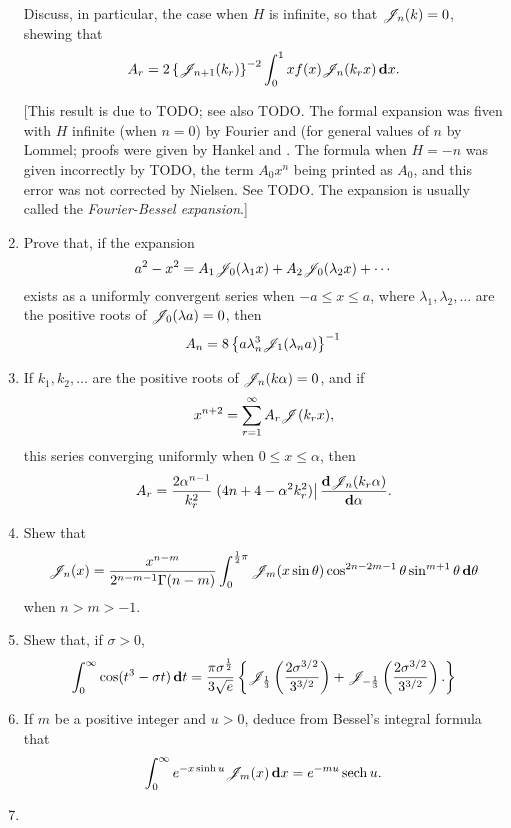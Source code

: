 \documentclass{book}
\begin{document}
\begin{enumerate}
  Discuss, in particular, the case when $H$ is infinite, so that
  $\mathscr{J}_{n}(k)=0$, shewing that
  $$
  A_{r}
  =
  2 \left\{ \mathscr{J}_{n+1}(k_{r}) \right\}^{-2}
  \int_{0}^{1}
  x f(x) \mathscr{J}_{n}(k_{r}x)
  \, \mathbf{d} x.
  $$

  [This result is due to TODO; see also TODO. The formal expansion was
  fiven with $H$ infinite (when $n=0$) by Fourier and (for general
  values of $n$ by Lommel; proofs were given by Hankel and \Schlafli.
  The formula when $H = -n$ was given incorrectly by TODO, the term
  $A_{0}x^{n}$ being printed as $A_{0}$, and this error was not
  corrected by Nielsen. See TODO. The expansion is usually called the
  \emph{Fourier-Bessel expansion}.]
\item
  Prove that, if the expansion
  $$
  a^{2} - x^{2}
  =
  A_{1} \mathscr{J}_{0}(\lambda_{1} x)
  + A_{2} \mathscr{J}_{0}(\lambda_{2} x)
  + \cdots
  $$
  exists as a uniformly convergent series when
  $ -a \leq x \leq a$, where $\lambda_{1}, \lambda_{2}, \ldots$ are
  the positive roots of $\mathscr{J}_{0}(\lambda a)=0$, then
  $$
  A_{n} = 8 \left\{  a \lambda_{n}^{3} \mathscr{J}_{1}(\lambda_{n} a) \right\}^{-1}
  $$
\item
  If $k_{1}, k_{2}, \ldots$ are the positive roots of
  $\mathscr{J}_{n}(k\alpha) = 0$, and if
  $$
  x^{n+2} = \sum_{r=1}^{\infty} A_{r} \mathscr{J}(k_{r}x),
  $$
  this series converging uniformly when $0 \leq x \leq \alpha$, then
  $$
  A_{r}
  =
  \frac{2 \alpha^{n-1}}{k_{r}^{2}}
  \left.
    (4n + 4 - \alpha^{2}k_{r}^{2})
  \right|
  \frac{\mathbf{d} \mathscr{J}_{n}(k_{r}\alpha)}{\mathbf{d} \alpha}.
  $$
\item
  Shew that
  $$
  \mathscr{J}_{n}(x)
  =
  \frac{x^{n-m}}{2^{n-m-1}\Gamma(n-m)}
  \int_{0}^{\frac{1}{2} \pi}
  \mathscr{J}_{m}(x\sin\theta)
  \cos^{2n-2m-1}\theta
  \sin^{m+1}\theta
  \, \mathbf{d} \theta
  $$
  when $n>m>-1$.
\item
  Shew that, if $\sigma>0$,
  $$
  \int_{0}^{\infty}
  \cos(t^{3} - \sigma t) \, \mathbf{d} t
  =
  \frac{\pi \sigma^{\frac{1}{2}}}{3\sqrt{e}}
  \left\{ 
    \mathscr{J}_{\frac{1}{3}} \left( \frac{2 \sigma^{3/2}}{3^{3/2}} \right)
    +
    \mathscr{J}_{-\frac{1}{3}} \left( \frac{2 \sigma^{3/2}}{3^{3/2}} \right).
   \right\}
  $$
\item
  If $m$ be a positive integer and $u>0$, deduce from Bessel's
  integral formula that
  $$
  \int_{0}^{\infty}
  e^{-x \sinh u} \mathscr{J}_{m}(x) \, \mathbf{d} x
  =
  e^{-mu} \operatorname{sech} u.
  $$
\item

\end{enumerate}
\end{document}
